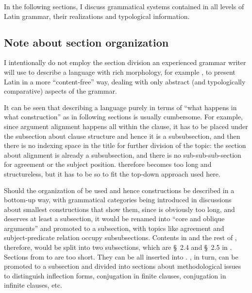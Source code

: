 \documentclass{article}
\newcommand*{\citesec}[1]{\S~{#1}}
\newcommand*{\citechap}[1]{chap.~{#1}}
\begin{document}
In the following sections,
I discuss grammatical systems contained in all levels of Latin grammar,
their realizations and typological information.

\subsection{Note about section organization}\label{sec:organization}

I intentionally do not employ the section division 
an experienced grammar writer will use to describe a language with rich morphology,
for example \citet[\citechap{2}]{jacques2021grammar},
to present Latin in a more ``content-free'' way,
dealing with only abstract (and typologically comparative) aspects of the grammar.

It can be seen that describing a language purely in terms of 
``what happens in what construction''
as in following sections
is usually cumbersome.
For example, since argument alignment happens all within the clause,
it has to be placed under the subsection about clause structure
and hence it is a subsubsection,
and then there is no indexing space in the title for further division of the topic:
the section about alignment is already a subsubsection,
and there is no sub-sub-sub-section for agreement or the subject position.
 therefore becomes too long and structureless,
but it has to be so to fit the top-down approach used here.

Should the organization of \citet[\citechap{2}]{jacques2021grammar} be used
and hence constructions be described in a bottom-up way,
with grammatical categories being introduced in discussions about smallest constructions that show them,
since  is obviously too long, and deserves at least a subsection,
it would be renamed into ``core and oblique arguments'' and promoted to a subsection,
with topics like agreement and subject-predicate relation occupy subsubsections.
Contents in  and the rest of ,
therefore, would be split into two subsections, 
which are \citesec{2.4} and \citesec{2.5} in \citet{jacques2021grammar}.
Sections from  to  are too short.
They can be all inserted into .
, in turn, can be 
promoted to a subsection and divided into 
sections about methodological issues to distinguish inflection forms,
conjugation in finite clauses,
conjugation in infinite clauses, etc.
\end{document}
